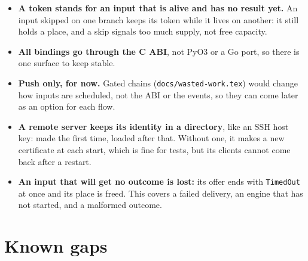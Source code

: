 \documentclass[11pt]{article}
\newcommand{\code}[1]{\texttt{#1}}
\begin{document}
\begin{itemize}[nosep]
        favor latency: $(D + Z)/D_{\max}$ from bound analysis, with service
        demands and round trips the client measures from events it already
        gets. This gives 1 for the chain with a slow end and 3 for three
        equal engines, as the sweeps found, and no fast branch has to be
        named. Inside a section, inputs wait in order instead of being
        skipped. In a simulation checked against the token sweeps, this
        matched the best single count in three of four chains with no wasted
        work, and was 6\% worse in the fourth. A count that is too high is
        costly in order, so it pays off where skipped work costs something. It replaces the earlier plan of fresh
        and gated modes per edge. Not built yet (``Sections'' in the design
        note).
  \item \textbf{A token stands for an input that is alive and has no result
        yet.} An input skipped on one branch keeps its token while it lives
        on another: it still holds a place, and a skip signals too much
        supply, not free capacity.
  \item \textbf{All bindings go through the C ABI}, not PyO3 or a Go port, so
        there is one surface to keep stable.
  \item \textbf{Push only, for now.} Gated chains (\code{docs/wasted-work.tex})
        would change how inputs are scheduled, not the ABI or the events, so
        they can come later as an option for each flow.
  \item \textbf{A remote server keeps its identity in a directory}, like an
        SSH host key: made the first time, loaded after that. Without one,
        it makes a new certificate at each start, which is fine for tests,
        but its clients cannot come back after a restart.
  \item \textbf{An input that will get no outcome is lost:} its offer ends
        with \code{TimedOut} at once and its place is freed. This covers a
        failed delivery, an engine that has not started, and a malformed
        outcome.
\end{itemize}

\section{Known gaps}
\end{document}
